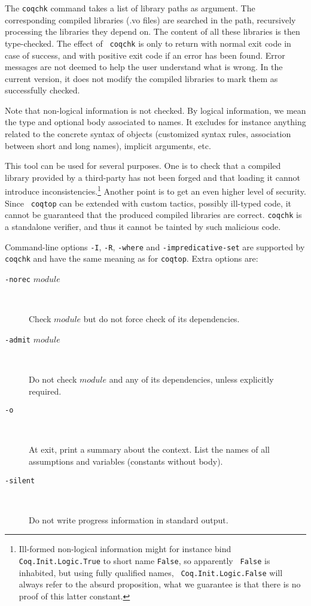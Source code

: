 The {\tt coqchk} command takes a list of library paths as argument.
The corresponding compiled libraries (.vo files) are searched in the
path, recursively processing the libraries they depend on. The content
of all these libraries is then type-checked. The effect of {\tt
  coqchk} is only to return with normal exit code in case of success,
and with positive exit code if an error has been found. Error messages
are not deemed to help the user understand what is wrong. In the
current version, it does not modify the compiled libraries to mark
them as successfully checked.

Note that non-logical information is not checked. By logical
information, we mean the type and optional body associated to names.
It excludes for instance anything related to the concrete syntax of
objects (customized syntax rules, association between short and long
names), implicit arguments, etc.

This tool can be used for several purposes. One is to check that a
compiled library provided by a third-party has not been forged and
that loading it cannot introduce inconsistencies.\footnote{Ill-formed
  non-logical information might for instance bind {\tt
    Coq.Init.Logic.True} to short name {\tt False}, so apparently {\tt
    False} is inhabited, but using fully qualified names, {\tt
    Coq.Init.Logic.False} will always refer to the absurd proposition,
  what we guarantee is that there is no proof of this latter
  constant.}
Another point is to get an even higher level of security. Since {\tt
  coqtop} can be extended with custom tactics, possibly ill-typed
code, it cannot be guaranteed that the produced compiled libraries are
correct. {\tt coqchk} is a standalone verifier, and thus it cannot be
tainted by such malicious code.

Command-line options {\tt -I}, {\tt -R}, {\tt -where} and
{\tt -impredicative-set} are supported by {\tt coqchk} and have the
same meaning as for {\tt coqtop}. Extra options are:
\begin{description}
\item[{\tt -norec} $module$]\ 

  Check $module$ but do not force check of its dependencies.
\item[{\tt -admit} $module$] \

  Do not check $module$ and any of its dependencies, unless
  explicitly required.
\item[{\tt -o}]\ 

  At exit, print a summary about the context. List the names of all
  assumptions and variables (constants without body).
\item[{\tt -silent}]\ 

  Do not write progress information in standard output.
\end{description}

